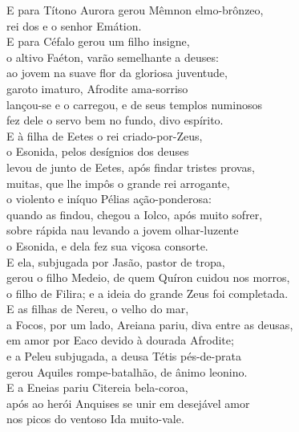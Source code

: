 \begin{pages}
\begin{Rightside}
\quad{}E para Títono Aurora gerou Mêmnon elmo-brônzeo,\\
rei dos  e o senhor Emátion. \\
E para Céfalo gerou um filho insigne,\\
o altivo Faéton, varão semelhante a deuses:\\
ao jovem na suave flor da gloriosa juventude,\\
garoto imaturo, Afrodite ama-sorriso\\
lançou-se e o carregou, e de seus templos numinosos \\
fez dele o servo bem no fundo, divo espírito.\\

\quad{}E à filha de Eetes o rei criado-por-Zeus,\\
o Esonida, pelos desígnios dos deuses \\
levou de junto de Eetes, após findar tristes provas,\\
muitas, que lhe impôs o grande rei arrogante, \\
o violento e iníquo Pélias ação-ponderosa:\\
quando as findou, chegou a Iolco, após muito sofrer,\\
sobre rápida nau levando a jovem olhar-luzente\\
o Esonida, e dela fez sua viçosa consorte.\\
E ela, subjugada por Jasão, pastor de tropa, \\
gerou o filho Medeio, de quem Quíron cuidou nos morros,\\
o filho de Filira; e a ideia do grande Zeus foi completada.\\

\quad{}E as filhas de Nereu, o velho do mar,\\
a Focos, por um lado, Areiana pariu, diva entre as deusas,\\
em amor por Eaco devido à dourada Afrodite; \\
e a Peleu subjugada, a deusa Tétis pés-de-prata\\
gerou Aquiles rompe-batalhão, de ânimo leonino.\\

\quad{}E a Eneias pariu Citereia bela-coroa,\\
após ao herói Anquises se unir em desejável amor\\
nos picos do ventoso Ida muito-vale. \\


\end{Rightside}
\end{pages}
